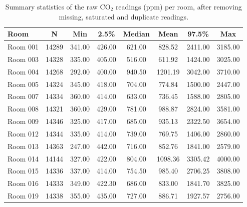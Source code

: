 \begin{table}[ht]
\centering
\begin{tabular}{lccccccc}
\hline
Room & N & Min & 2.5\% & Median & Mean & 97.5\% & Max \\
\hline
Room 001 & 14289 & 341.00 & 426.00 & 621.00 & 828.52 & 2411.00 & 3185.00 \\
Room 003 & 14328 & 335.00 & 405.00 & 516.00 & 611.92 & 1424.00 & 3025.00 \\
Room 004 & 14268 & 292.00 & 400.00 & 940.50 & 1201.19 & 3042.00 & 3710.00 \\
Room 005 & 14324 & 345.00 & 418.00 & 704.00 & 774.84 & 1500.00 & 2447.00 \\
Room 007 & 14334 & 360.00 & 414.00 & 633.00 & 736.45 & 1588.00 & 2805.00 \\
Room 008 & 14321 & 360.00 & 429.00 & 781.00 & 988.87 & 2824.00 & 3581.00 \\
Room 009 & 14346 & 325.00 & 417.00 & 685.00 & 935.13 & 2322.50 & 3654.00 \\
Room 012 & 14344 & 335.00 & 414.00 & 739.00 & 769.75 & 1406.00 & 2860.00 \\
Room 013 & 14363 & 247.00 & 442.00 & 716.00 & 852.76 & 1841.00 & 2579.00 \\
Room 014 & 14144 & 327.00 & 422.00 & 804.00 & 1098.36 & 3305.42 & 4000.00 \\
Room 015 & 14336 & 337.00 & 414.00 & 754.50 & 985.40 & 2706.25 & 3808.00 \\
Room 016 & 14333 & 349.00 & 422.30 & 686.00 & 833.00 & 1841.70 & 3825.00 \\
Room 019 & 14338 & 355.00 & 435.00 & 727.00 & 886.71 & 1927.57 & 2756.00 \\
\hline
\end{tabular}
\caption{Summary statistics of the raw CO$_2$ readings (ppm) per room, after removing missing, saturated and duplicate readings.}
\label{tab:raw_co2_summary}
\end{table}

